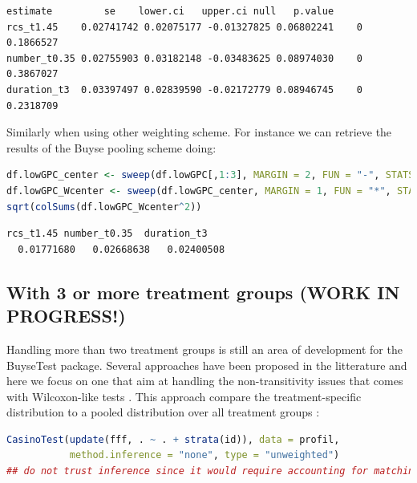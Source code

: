 \documentclass[12pt]{article}
\begin{document}
\label{}
\begin{verbatim}
estimate         se    lower.ci   upper.ci null   p.value
rcs_t1.45    0.02741742 0.02075177 -0.01327825 0.06802241    0 0.1866527
number_t0.35 0.02755903 0.03182148 -0.03483625 0.08974030    0 0.3867027
duration_t3  0.03397497 0.02839590 -0.02172779 0.08946745    0 0.2318709
\end{verbatim}


\noindent  Similarly when using other weighting scheme. For instance we can
retrieve the results of the Buyse pooling scheme doing:
\begin{lstlisting}[language=r,numbers=none]
df.lowGPC_center <- sweep(df.lowGPC[,1:3], MARGIN = 2, FUN = "-", STATS = coef(lowGPC_Buyse))
df.lowGPC_Wcenter <- sweep(df.lowGPC_center, MARGIN = 1, FUN = "*", STATS = df.lowGPC$Buyse)
sqrt(colSums(df.lowGPC_Wcenter^2))
\end{lstlisting}

\label{}
\begin{verbatim}
rcs_t1.45 number_t0.35  duration_t3 
  0.01771680   0.02668638   0.02400508
\end{verbatim}


\clearpage
\subsection{With 3 or more treatment groups (WORK IN PROGRESS!)}
\label{sec:org6db1537}

Handling more than two treatment groups is still an area of
development for the BuyseTest package. Several approaches have been
proposed in the litterature and here we focus on one that aim at
handling the non-transitivity issues that comes with Wilcoxon-like
tests \citep{lumley2016characterising}. This approach compare the
treatment-specific distribution to a pooled distribution over all
treatment groups \citep{thangavelu2007wilcoxon}:

\begin{lstlisting}[language=r,numbers=none]
CasinoTest(update(fff, . ~ . + strata(id)), data = profil,
           method.inference = "none", type = "unweighted")
## do not trust inference since it would require accounting for matching
\end{lstlisting}
\end{document}
